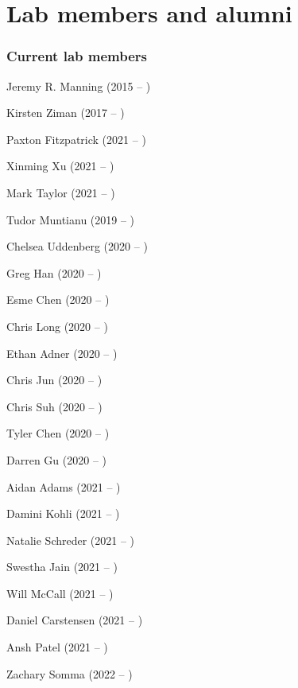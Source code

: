 \documentclass{tufte-book} %
\begin{document}
\chapter{Lab members and alumni}\label{ch:members}
\begin{fullwidth}
\subsection{Current lab members}\label{sec:curr_members}
\bigskip

\enskip Jeremy R. Manning (2015 -- )


\begin{multicols}{2}\raggedcolumns
\begin{list}{\quad}{}
\item Kirsten Ziman (2017 -- )
\item Paxton Fitzpatrick (2021 -- )
\item Xinming Xu (2021 -- )
\end{list}
\end{multicols}


\begin{multicols}{2}\raggedcolumns
\begin{list}{\quad}{}
\item Mark Taylor (2021 -- )
\end{list}
\end{multicols}


\begin{multicols}{2}\raggedcolumns
\begin{list}{\quad}{}
\item Tudor Muntianu (2019 -- )
\item Chelsea Uddenberg (2020 -- )
\item Greg Han (2020 -- )
\item Esme Chen (2020 -- )
\item Chris Long (2020 -- )
\item Ethan Adner (2020 -- )
\item Chris Jun (2020 -- )
\item Chris Suh (2020 -- )
\item Tyler Chen (2020 -- )
\item Darren Gu (2020 -- )
\item Aidan Adams (2021 -- )
\item Damini Kohli (2021 -- )
\item Natalie Schreder (2021 -- )
\item Swestha Jain (2021 -- )
\item Will McCall (2021 -- )
\item Daniel Carstensen (2021 -- )
\item Ansh Patel (2021 -- )
\item Zachary Somma (2022 -- )
\end{list}
\end{multicols}


\end{fullwidth}
\end{document}
